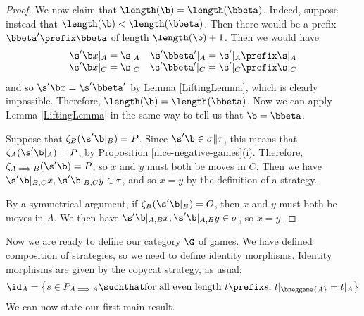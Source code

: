 \documentclass[11pt]{article} %
\begin{document}
\begin{proposition}
\begin{proof}
    We now claim that $\length(\b)=\length(\bbeta)$.  Indeed, suppose instead that $\length(\b)<\length(\bbeta)$.  Then there would be a prefix $\bbeta'\prefix\bbeta$ of length $\length(\b)+1$.  Then we would have
    \[
      \begin{matrix}
        \s'\b x\vert_A=\s\vert_A & \s'\bbeta'\vert_A=\s'\vert_A\prefix\s\vert_A \\
        \s'\b x\vert_C=\s\vert_C & \s'\bbeta'\vert_C=\s'\vert_C\prefix\s\vert_C
      \end{matrix}
      \]
    and so $\s'\b x=\s'\bbeta'$ by Lemma \ref{LiftingLemma}, which is clearly impossible.  Therefore, $\length(\b)=\length(\bbeta)$.  Now we can apply Lemma \ref{LiftingLemma} in the same way to tell us that $\b=\bbeta$.

    Suppose that $\zeta_B(\s'\b\vert_B)=P$.  Since $\s'\b\in\sigma\|\tau$, this means that $\zeta_A(\s'\b\vert_A)=P$, by Proposition \ref{nice-negative-games}(i).  Therefore, $\zeta_{A\implies B}(\s'\b)=P$, so $x$ and $y$ must both be moves in $C$.  Then we have $\s'\b\vert_{B,C}x,\s'\b\vert_{B,C}y\in\tau$, and so $x=y$ by the definition of a strategy.

    By a symmetrical argument, if $\zeta_B(\s'\b\vert_B)=O$, then $x$ and $y$ must both be moves in $A$.  We then have $\s'\b\vert_{A,B}x,\s'\b\vert_{A,B}y\in\sigma$, so $x=y$.
  \end{proof}
\end{proposition}

Now we are ready to define our category $\G$ of games.  We have defined composition of strategies, so we need to define identity morphisms.  Identity morphisms are given by the copycat strategy, as usual:
\[
  \id_A=\left\{s\in P_{A\implies A}\suchthat\textrm{for all even length $t\prefix s$, $t\vert_\bneggame{A}=t\vert_A$}\right\}
  \]
We can now state our first main result.
\end{document}
